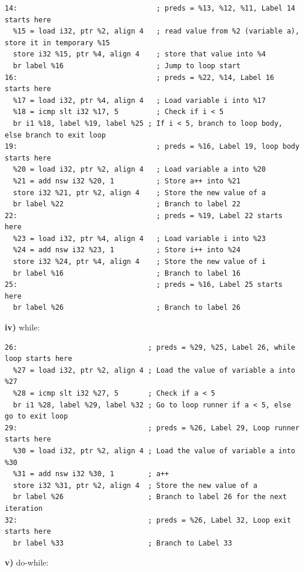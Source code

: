 \begin{lstlisting}
14:                                 ; preds = %13, %12, %11, Label 14 starts here
  %15 = load i32, ptr %2, align 4   ; read value from %2 (variable a), store it in temporary %15
  store i32 %15, ptr %4, align 4    ; store that value into %4
  br label %16                      ; Jump to loop start
16:                                 ; preds = %22, %14, Label 16 starts here
  %17 = load i32, ptr %4, align 4   ; Load variable i into %17
  %18 = icmp slt i32 %17, 5         ; Check if i < 5
  br i1 %18, label %19, label %25 ; If i < 5, branch to loop body, else branch to exit loop
19:                                 ; preds = %16, Label 19, loop body starts here
  %20 = load i32, ptr %2, align 4   ; Load variable a into %20
  %21 = add nsw i32 %20, 1          ; Store a++ into %21
  store i32 %21, ptr %2, align 4    ; Store the new value of a
  br label %22                      ; Branch to label 22
22:                                 ; preds = %19, Label 22 starts here
  %23 = load i32, ptr %4, align 4   ; Load variable i into %23
  %24 = add nsw i32 %23, 1          ; Store i++ into %24
  store i32 %24, ptr %4, align 4    ; Store the new value of i
  br label %16                      ; Branch to label 16
25:                                 ; preds = %16, Label 25 starts here
  br label %26                      ; Branch to label 26
\end{lstlisting}

\textbf{iv) }while:


\begin{lstlisting}
26:                               ; preds = %29, %25, Label 26, while loop starts here
  %27 = load i32, ptr %2, align 4 ; Load the value of variable a into %27
  %28 = icmp slt i32 %27, 5       ; Check if a < 5
  br i1 %28, label %29, label %32 ; Go to loop runner if a < 5, else go to exit loop
29:                               ; preds = %26, Label 29, Loop runner starts here
  %30 = load i32, ptr %2, align 4 ; Load the value of variable a into %30
  %31 = add nsw i32 %30, 1        ; a++
  store i32 %31, ptr %2, align 4  ; Store the new value of a
  br label %26                    ; Branch to label 26 for the next iteration
32:                               ; preds = %26, Label 32, Loop exit starts here
  br label %33                    ; Branch to Label 33
\end{lstlisting}

\textbf{v)} do-while:


